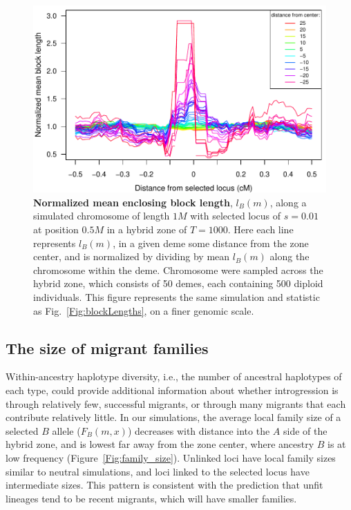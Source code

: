 \documentclass[11pt,letterpaper]{article}
\begin{document}
\begin{figure}
\includegraphics{figs/blocksAlongChromAncBConditioningHighRes.pdf}
\caption{\textbf{Normalized mean enclosing block length}, $l_B(m)$, along a simulated chromosome of length $1M$ with selected locus of $s=0.01$ at position $0.5M$ in a hybrid zone of $T=1000$. Here each line represents  $l_B(m)$, in a given deme some distance from the zone center, and is normalized by dividing by mean $l_B(m)$ along the chromosome within the deme. Chromosome were sampled across the hybrid zone, which consists of 50 demes, each containing 500 diploid individuals. This figure represents the same simulation and statistic as Fig.~\ref{Fig:blockLengths}, on a finer genomic scale.
}\label{Fig:blockLengthsZoom}
\end{figure}


\subsection*{The size of migrant families}

Within-ancestry haplotype diversity, i.e., the number of ancestral haplotypes of each type,
could provide additional information about whether introgression is through relatively few, successful migrants, 
or through many migrants that each contribute relatively little. 
In our simulations, the average local family size of a selected $B$ allele ($F_B(m,x)$) decreases with distance into the $A$ side of the hybrid zone, 
and is lowest far away from the zone center, where ancestry $B$ is at low frequency (Figure~\ref{Fig:family_size}). 
Unlinked loci have local family sizes similar to neutral simulations,
and loci linked to the selected locus have intermediate sizes.
This pattern is consistent with the prediction 
that unfit lineages tend to be recent migrants,
which will have smaller families.  
\end{document}

